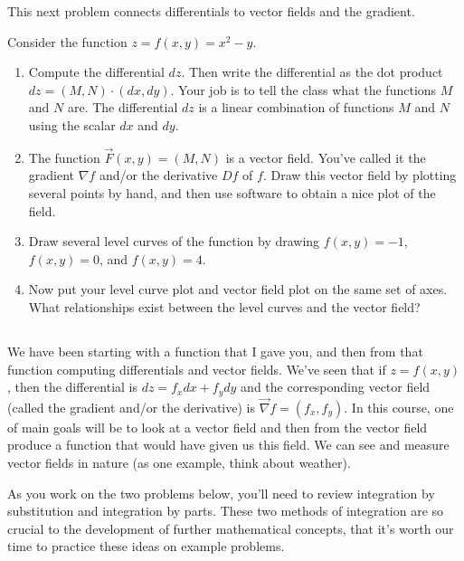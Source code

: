 This next problem connects differentials to vector fields and the gradient.




\begin{problem}
 Consider the function $z=f(x,y) = x^2-y$. 
\begin{enumerate}
 \item Compute the differential $dz$.  Then write the differential as the dot product $dz = (M,N)\cdot (dx,dy)$. Your job is to tell the class what the functions $M$ and $N$ are. The differential $dz$ is a linear combination of functions $M$ and $N$ using the scalar $dx$ and $dy$. 
 \item{}%
The function $\vec F(x,y) = (M,N)$ is a vector field. You've called it the gradient $\nabla f$ and/or the derivative $Df$ of $f$. Draw this vector field by plotting several points by hand, and then use software to obtain a nice plot of the field.
 \item {}%
Draw several level curves of the function by drawing $f(x,y)=-1$, $f(x,y)=0$, and $f(x,y)=4$.
 \item Now put your level curve plot and vector field plot on the same set of axes. What relationships exist between the level curves and the vector field? 
\end{enumerate}
\end{problem}

\subsection*{\ideaC}


We have been starting with a function that I gave you, and then from that function computing differentials and vector fields. We've seen that if $z=f(x,y)$, then the differential is $dz=f_xdx+f_ydy$ and the corresponding vector field (called the gradient and/or the derivative) is $\vec \nabla f = (f_x,f_y)$.  In this course, one of main goals will be to look at a vector field and then from the vector field produce a function that would have given us this field. We can see and measure vector fields in nature (as one example, think about weather).

As you work on the two problems below, you'll need to review integration by substitution and integration by parts.  These two methods of integration are so crucial to the development of further mathematical concepts, that it's worth our time to practice these ideas on example problems.  

